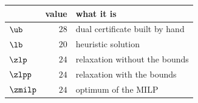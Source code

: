 \begin{center}\small
\begin{tabular}{lrl}
\toprule
 & value & what it is \\
\midrule
$\ub$ & $28$ & dual certificate built by hand \\
$\lb$ & $20$ & heuristic solution \\
$\zlp$ & $24$ & relaxation without the bounds \\
$\zlpp$ & $24$ & relaxation with the bounds \\
$\zmilp$ & $24$ & optimum of the MILP \\
\bottomrule
\end{tabular}
\end{center}
